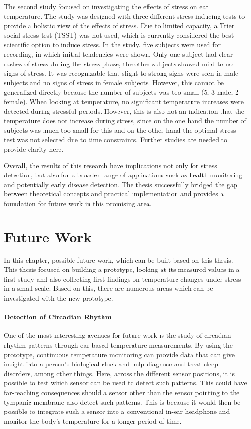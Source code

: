 The second study focused on investigating the effects of stress on ear temperature. 
The study was designed with three different stress-inducing tests to provide a holistic view of the effects of stress. 
Due to limited capacity, a Trier social stress test (TSST) was not used, which is currently considered the best scientific option to induce stress.
In the study, five subjects were used for recording, in which initial tendencies were shown.
Only one subject had clear rashes of stress during the stress phase, the other subjects showed mild to no signs of stress.
It was recognizable that slight to strong signs were seen in male subjects and no signs of stress in female subjects.
However, this cannot be generalized directly because the number of subjects was too small (5, 3 male, 2 female).
When looking at temperature, no significant temperature increases were detected during stressful periods.
However, this is also not an indication that the temperature does not increase during stress, since on the one hand the number of subjects was much too small for this and on the other hand the optimal stress test was not selected due to time constraints.
Further studies are needed to provide clarity here.

Overall, the results of this research have implications not only for stress detection, but also for a broader range of applications such as health monitoring and potentially early disease detection.
The thesis successfully bridged the gap between theoretical concepts and practical implementation and provides a foundation for future work in this promising area.

\section{Future Work}
In this chapter, possible future work, which can be built based on this thesis.
This thesis focused on building a prototype, looking at its measured values in a first study and also collecting first findings on temperature changes under stress in a small scale.
Based on this, there are numerous areas which can be investigated with the new prototype.

\paragraph{Detection of Circadian Rhythm}
One of the most interesting avenues for future work is the study of circadian rhythm patterns through ear-based temperature measurements. 
By using the prototype, continuous temperature monitoring can provide data that can give insight into a person's biological clock and help diagnose and treat sleep disorders, among other things.
Here, across the different sensor positions, it is possible to test which sensor can be used to detect such patterns.
This could have far-reaching consequences should a sensor other than the sensor pointing to the tympanic membrane also detect such patterns. 
This is because it would then be possible to integrate such a sensor into a conventional in-ear headphone and monitor the body's temperature for a longer period of time.

